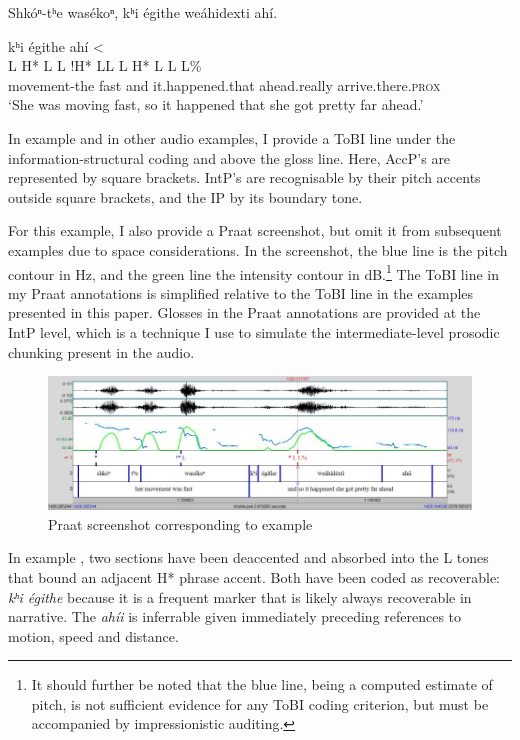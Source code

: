\documentclass[output=paper]{LSP/langsci}
\begin{document}
\ea\label{wolfedeaccenting}
Shkóⁿ-tʰe wasékoⁿ, kʰi égithe weáhidexti ahí.\rmfnm

\glll 	{}			kʰi 		égithe 				{ahí <}\\
	{\ob L H* L\cb}		{\ob L !H* L\cb{}L}		{\ob L}	{}			{H* L}				{\cb{}L L\%}\\
	movement-the 		fast 				and 		it.happened.that 	ahead.really	 		arrive.there.\textsc{prox}\\
\glt `She was moving fast, so it happened that she got pretty far ahead.'
\z

In example  and in other audio examples, I provide a ToBI line under the information-structural coding and above the gloss line. Here, AccP’s are represented by square brackets. IntP’s are recognisable by their pitch accents outside square brackets, and the IP by its boundary tone. 

For this example, I also provide a Praat \citep{BoersmaWeenink1992} screenshot, but omit it from subsequent examples due to space considerations. In the screenshot, the blue line is the pitch contour in Hz, and the green line the intensity contour in dB.\footnote{It should further be noted that the blue line, being a computed estimate of pitch, is not sufficient evidence for any ToBI coding criterion, but must be accompanied by impressionistic auditing.} The ToBI line in my Praat annotations is simplified relative to the ToBI line in the examples presented in this paper. Glosses in the Praat annotations are provided at the IntP level, which is a technique I use to simulate the intermediate-level prosodic chunking present in the audio.

\begin{figure}\includegraphics[width=12cm]{figures/Gordon1}\caption{Praat screenshot corresponding to example }\label{wolfedeaccentingscreenshot}\end{figure}

In example , two sections have been deaccented and absorbed into the L tones that bound an adjacent H* phrase accent. Both have been coded as recoverable: \textit{kʰi égithe} because it is a frequent  marker that is likely always recoverable in narrative. The  \textit{ahíi} is inferrable given immediately preceding references to motion, speed and distance.
\end{document}
